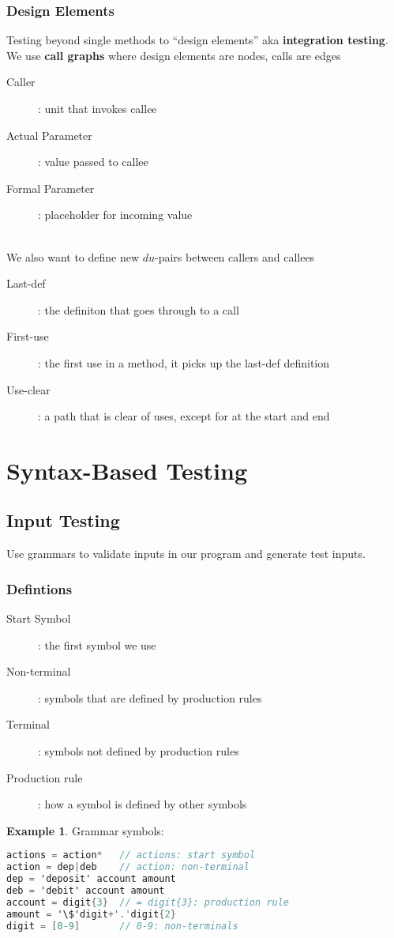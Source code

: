 \documentclass[]{article}
\theoremstyle{definition}
\newtheorem{ex}{Example}[section]
\begin{document}
			\subsubsection{Design Elements}
				Testing beyond single methods to ``design elements'' aka \textbf{integration testing}. We use \textbf{call graphs} where design elements are nodes, calls are edges
				\begin{description}
					\item[Caller]: unit that invokes callee
					\item[Actual Parameter]: value passed to callee
					\item[Formal Parameter]: placeholder for incoming value
				\end{description}
				\hfill \\
				We also want to define new $du$-pairs between callers and callees
				\begin{description}
					\item[Last-def]: the definiton that goes through to a call
					\item[First-use]: the first use in a method, it picks up the last-def definition 
					\item[Use-clear]: a path that is clear of uses, except for at the start and end
				\end{description}
		\section{Syntax-Based Testing}
			\subsection{Input Testing}
				Use grammars to validate inputs in our program and generate test inputs.
				\subsubsection{Defintions}
					\begin{description}
						\item[Start Symbol]: the first symbol we use
						\item[Non-terminal]: symbols that are defined by production rules
						\item[Terminal]: symbols not defined by production rules
						\item[Production rule]: how a symbol is defined by other symbols
					\end{description}
					\begin{ex}
						Grammar symbols:
						\begin{lstlisting}[language=C]
actions = action*	// actions: start symbol
action = dep|deb	// action: non-terminal
dep = 'deposit' account amount		
deb = 'debit' account amount		
account = digit{3}	// = digit{3}: production rule
amount = '\$'digit+'.'digit{2}
digit = [0-9]		// 0-9: non-terminals
						\end{lstlisting}
					\end{ex}
\end{document}
